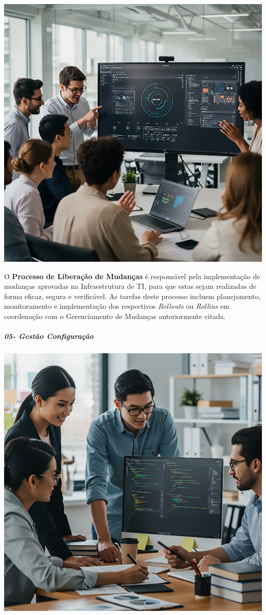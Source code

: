\documentclass[
]{book}
\begin{document}
\includegraphics{images/InfraEstrutura/ITIL/04-Gerencia_de_Liberação-01.jpg}

O \textbf{Processo de Liberação de Mudanças} é responsável pela implementação de mudanças aprovadas na Infraestrutura de TI, para que estas sejam realizadas de forma eficaz, segura e verificável. As tarefas deste processo incluem planejamento, monitoramento e implementação dos respectivos \emph{Rollouts} ou \emph{Rollins} em coordenação com o Gerenciamento de Mudanças anteriormente citada.

\subparagraph{05- Gestão Configuração}\label{gestuxe3o-configurauxe7uxe3o}

\includegraphics{images/InfraEstrutura/ITIL/05-Gerencia_de_configuração.jpg}
\end{document}
